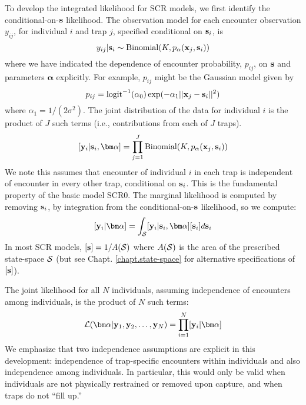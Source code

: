 To develop the integrated likelihood for SCR models, we first identify
the conditional-on-${\bf s}$ likelihood.  The observation model for
each encounter observation $y_{ij}$, for individual $i$ and trap $j$,
specified conditional on ${\bf s}_{i}$, is
\begin{equation}
y_{ij}| {\bf s}_{i} \sim \mbox{Binomial}(K, p_{\alpha}({\bf x}_{j},{\bf s}_{i}))
\label{mle.eq.cond-on-s}
\end{equation}
where we have indicated the dependence of encounter probability,
$p_{ij}$, on ${\bf s}$ and parameters ${\bm \alpha}$ explicitly. For
example, $p_{ij}$ might be the Gaussian model given by
\[
 p_{ij} = \mbox{logit}^{-1}(\alpha_{0})\exp( -\alpha_{1} ||{\bf x}_{j} - {\bf s}_{i}||^{2})
\]
where $\alpha_{1} = 1/(2\sigma^2)$.  The joint distribution of the
data for individual $i$ is the product of $J$ such terms (i.e.,
contributions from each of $J$ traps).
\[
  [{\bf y}_{i} | {\bf s}_{i} , {\bm \alpha}] = 
  \prod_{j=1}^{J} \mbox{Binomial}(K, p_{\alpha}({\bf x}_{j},{\bf s}_{i}) )
\]
We note this assumes that encounter of individual $i$ in each trap is
independent of encounter in every other trap, conditional on ${\bf
  s}_{i}$. This is the fundamental property of the basic model SCR0.
The marginal likelihood is computed by removing ${\bf s}_{i}$, by
integration from the conditional-on-${\bf s}$ likelihood, so we
compute:
\[
  [{\bf y}_{i}|{\bm \alpha}] = 
\int_{{\cal S}}  [ {\bf y}_{i} |{\bf s}_{i}, {\bm \alpha}] [{\bf s}_{i}] d{\bf s}_{i}
\]
In most SCR models, $[{\bf s}] = 1/A({\cal S})$ where $A({\cal S})$ is
the area of the prescribed state-space ${\cal S}$ (but see
Chapt. \ref{chapt.state-space} for alternative specifications of
$[{\bf s}]$).

The joint likelihood for all $N$ individuals, assuming independence of
encounters among individuals, is the product of $N$ such terms:
\[
{\cal L}({\bm \alpha} | {\bf y}_{1},{\bf y}_{2},\ldots, {\bf y}_{N}) =     \prod_{i=1}^{N}
[{\bf y}_{i}|{\bm \alpha}]
\]
We emphasize that two independence assumptions are explicit in this
development: independence of trap-specific encounters within
individuals and also independence among individuals. In particular,
this would only be valid when individuals are not physically
restrained or removed upon capture, and when traps do not ``fill up.''


